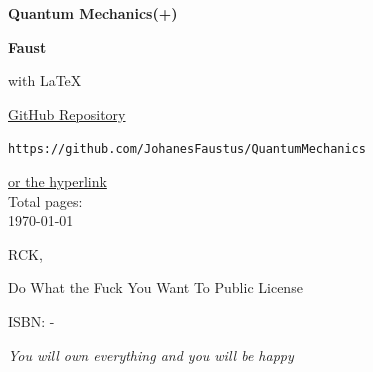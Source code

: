 \documentclass[../../main.tex]{subfiles}
\begin{document}
\thispagestyle{empty}
\begin{center}

  \Huge
  \textbf{Quantum Mechanics(+)}

  \vspace{\fill}
  \Large
  \textbf{Faust}\footnotemark[1]

  \vspace{0.2cm}
  \large with \LaTeX
  \vspace{\fill}
  \centering
  \vspace{\fill}


\end{center}

\clearpage

\thispagestyle{empty}
\vspace*{\fill}
\begin{center}

  \vspace{0.5cm}
  \Large\href{https://github.com/JohanesFaustus/QuantumMechanics}{GitHub Repository}

  \vspace{0.2cm}

  \normalsize
  \texttt{https://github.com/JohanesFaustus/QuantumMechanics}

  \href{https://github.com/JohanesFaustus/QuantumMechanics}{or the hyperlink}\\
  \vspace{\fill}
  Total pages: \pageref{LastPage}\\
  {\today}
\end{center}
\vspace*{\fill}

\clearpage

\begin{center}
  RCK, \MonthName{} \the\year

  Do What the Fuck You Want To Public License

  ISBN: -
  
  \vspace*{2em}
  
  \textit{You will own everything and you will be happy}
\end{center}

\vspace*{2em}
\end{document}
